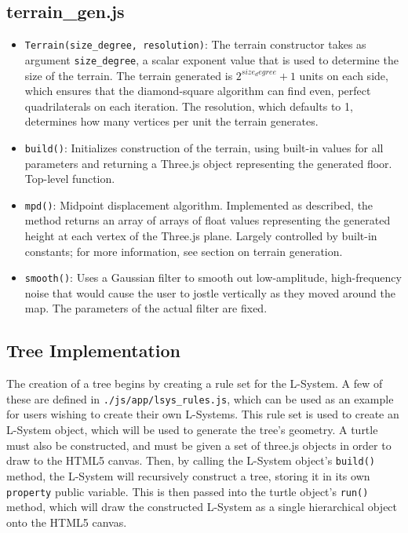\documentclass{article}
\newcommand{\tab}{\hspace*{2em}}
\begin{document}
            \subsection{terrain\_gen.js}
\begin{itemize}
    \item \verb|Terrain(size_degree, resolution)|: The terrain constructor takes as argument
\verb|size_degree|, a scalar exponent value that is used to determine the size of the terrain. The
terrain generated is $2^{size_degree}+1$ units on each side, which ensures that the diamond-square
algorithm can find even, perfect quadrilaterals on each iteration. The resolution, which defaults
to 1, determines how many vertices per unit the terrain generates. 

    \item \verb|build()|: Initializes construction of the terrain, using built-in values for all
parameters and returning a Three.js object representing the generated floor. Top-level function.

    \item \verb|mpd()|: Midpoint displacement algorithm. Implemented as described, the method
returns an array of arrays of float values representing the generated height at each vertex of the
Three.js plane. Largely controlled by built-in constants; for more information, see section on
terrain generation.

    \item \verb|smooth()|: Uses a Gaussian filter to smooth out low-amplitude, high-frequency noise
that would cause the user to jostle vertically as they moved around the map. The parameters of the
actual filter are fixed.
\end{itemize}

        \subsection{Tree Implementation}
    \tab The creation of a tree begins by creating a rule set for the L-System. A few of these are
defined in \verb|./js/app/lsys_rules.js|, which can be used as an example for users wishing to
create their own L-Systems. This rule set is used to create an L-System object, which will be used
to generate the tree's geometry. A turtle must also be constructed, and must be given a set of
three.js objects in order to draw to the HTML5 canvas. Then, by calling the L-System object's
\verb|build()| method, the L-System will recursively construct a tree, storing it in its own
\verb|property| public variable. This is then passed into the turtle object's \verb|run()| method,
which will draw the constructed L-System as a single hierarchical object onto the HTML5 canvas.
\end{document}
